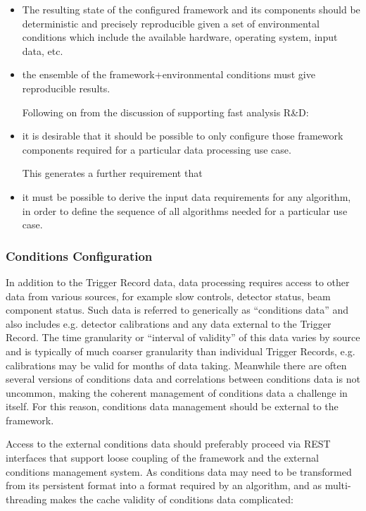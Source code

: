 \documentclass[../main-v1.tex]{subfiles}
\begin{document}
\begin{itemize}
\item The resulting state of the configured framework and its components should be deterministic and precisely reproducible given a set of environmental conditions which include the available hardware, operating system, input data, etc.  

\item the ensemble of the framework+environmental conditions must give reproducible results.  

Following on from the discussion of supporting fast analysis R\&D:

\item it is desirable that it should be possible to only configure those framework components required for a particular data processing use case.  

This generates a further requirement that 

\item it must be possible to derive the input data requirements for any algorithm, in order to define the sequence of all algorithms needed for a particular use case.
\end{itemize}
 
\subsubsection{Conditions Configuration}

In addition to the Trigger Record data, data processing requires access to other data from various sources, for example slow controls, detector status, beam component status.  Such data is referred to generically as “conditions data” and also includes e.g. detector calibrations and any data external to the Trigger Record.  The time granularity or “interval of validity” of this data varies by source and is typically of much coarser granularity than individual Trigger Records, e.g. calibrations may be valid for months of data taking.  Meanwhile there are often several versions of conditions data and correlations between conditions data is not uncommon, making the coherent management of conditions data a challenge in itself.  For this reason, conditions data management should be external to the framework.

Access to the external conditions data should preferably proceed via REST interfaces that support loose coupling of the framework and the external conditions management system.  As conditions data may need to be transformed from its persistent format into a format required by an algorithm, and as multi-threading makes the cache validity of conditions data complicated: 
\end{document}
